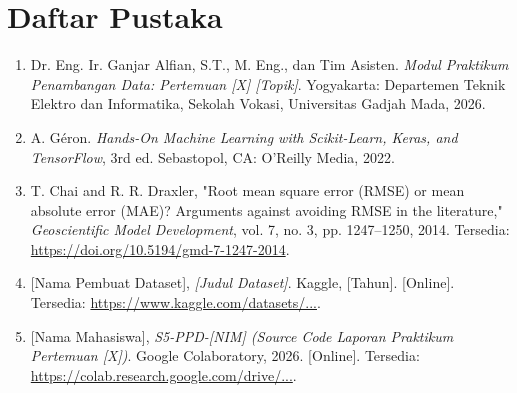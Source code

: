 \documentclass[a4paper,oneside,11pt]{book}
\begin{document}
\chapter{Daftar Pustaka}
\label{chap:daftarpustaka}

\begin{enumerate}
    \item \label{modulPraktikum} Dr. Eng. Ir. Ganjar Alfian, S.T., M. Eng., dan Tim Asisten. \textit{Modul Praktikum Penambangan Data: Pertemuan [X] [Topik]}. Yogyakarta: Departemen Teknik Elektro dan Informatika, Sekolah Vokasi, Universitas Gadjah Mada, 2026.
    
    \item \label{bukuML} A. Géron. \textit{Hands-On Machine Learning with Scikit-Learn, Keras, and TensorFlow}, 3rd ed. Sebastopol, CA: O'Reilly Media, 2022.
    
    \item \label{jurnalMetrik} T. Chai and R. R. Draxler, "Root mean square error (RMSE) or mean absolute error (MAE)? Arguments against avoiding RMSE in the literature," \textit{Geoscientific Model Development}, vol. 7, no. 3, pp. 1247--1250, 2014. Tersedia: \url{https://doi.org/10.5194/gmd-7-1247-2014}.
    
    \item \label{sumberDataset} [Nama Pembuat Dataset], \textit{[Judul Dataset]}. Kaggle, [Tahun]. [Online]. Tersedia: \url{https://www.kaggle.com/datasets/...}.
    
    \item \label{colabLaporan} [Nama Mahasiswa], \textit{S5-PPD-[NIM] (Source Code Laporan Praktikum Pertemuan [X])}. Google Colaboratory, 2026. [Online]. Tersedia: \url{https://colab.research.google.com/drive/...}.
\end{enumerate}
\end{document}
